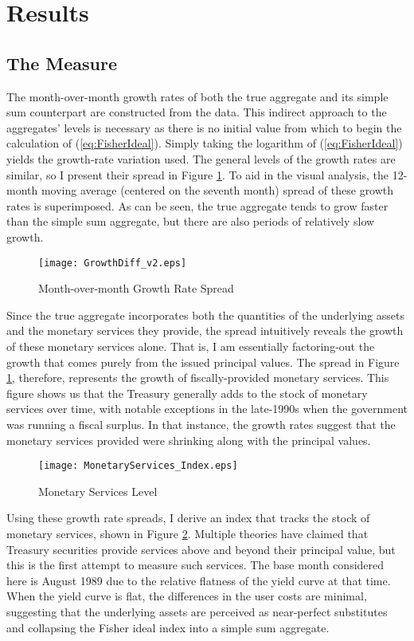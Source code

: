 \documentclass[11pt,a4paper,margin=1.5in]{article}
\begin{document}
\section{Results}
\label{sec:Results}

\subsection{The Measure}
\label{subsec:Results_Measure}

The month-over-month growth rates of both the true aggregate and its simple sum counterpart are constructed from the data.
This indirect approach to the aggregates' levels is necessary as there is no initial value from which to begin the calculation of (\ref{eq:FisherIdeal}).
Simply taking the logarithm of (\ref{eq:FisherIdeal}) yields the growth-rate variation used.
The general levels of the growth rates are similar, so I present their spread in Figure \ref{fig:Growth_Spread}.
To aid in the visual analysis, the 12-month moving average (centered on the seventh month) spread of these growth rates is superimposed.
As can be seen, the true aggregate tends to grow faster than the simple sum aggregate, but there are also periods of relatively slow growth.
\begin{figure}[h]
\centering
\texttt{[image: GrowthDiff\_v2.eps]}
\caption{Month-over-month Growth Rate Spread}
\label{fig:Growth_Spread}
\end{figure}

Since the true aggregate incorporates both the quantities of the underlying assets and the monetary services they provide, the spread intuitively reveals the growth of these monetary services alone.
That is, I am essentially factoring-out the growth that comes purely from the issued principal values.
The spread in Figure \ref{fig:Growth_Spread}, therefore, represents the growth of fiscally-provided monetary services.
This figure shows us that the Treasury generally adds to the stock of monetary services over time, with notable exceptions in the late-1990s when the government was running a fiscal surplus.
In that instance, the growth rates suggest that the monetary services provided were shrinking along with the principal values. 


\begin{figure}[h]
\centering
\texttt{[image: MonetaryServices\_Index.eps]}
\caption{Monetary Services Level}
\label{fig:MS_Index}
\end{figure}
Using these growth rate spreads, I derive an index that tracks the stock of monetary services, shown in Figure \ref{fig:MS_Index}.
Multiple theories have claimed that Treasury securities provide services above and beyond their principal value, but this is the first attempt to measure such services. 
The base month considered here is August 1989 due to the relative flatness of the yield curve at that time.
When the yield curve is flat, the differences in the user costs are minimal, suggesting that the underlying assets are perceived as near-perfect substitutes and collapsing the Fisher ideal index into a simple sum aggregate.
\end{document}
